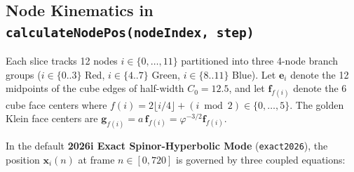 \documentclass[11pt, a4paper]{article}
\begin{document}
\subsection{Node Kinematics in \texttt{calculateNodePos(nodeIndex, step)}}
Each slice tracks 12 nodes $i \in \{0, \dots, 11\}$ partitioned into three 4-node branch groups ($i \in \{0..3\}$ Red, $i \in \{4..7\}$ Green, $i \in \{8..11\}$ Blue). Let $\mathbf{e}_i$ denote the 12 midpoints of the cube edges of half-width $C_0 = 12.5$, and let $\mathbf{f}_{f(i)}$ denote the 6 cube face centers where $f(i) = 2\lfloor i/4\rfloor + (i \bmod 2) \in \{0, \dots, 5\}$. The golden Klein face centers are $\mathbf{g}_{f(i)} = a\,\mathbf{f}_{f(i)} = \varphi^{-3/2}\mathbf{f}_{f(i)}$.

In the default \textbf{2026i Exact Spinor-Hyperbolic Mode} (\texttt{exact2026}), the position $\mathbf{x}_i(n)$ at frame $n \in [0, 720]$ is governed by three coupled equations:
\end{document}
